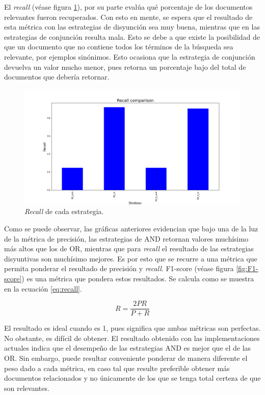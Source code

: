 El \textit{recall} (véase figura \ref{fig:Recall}), por su parte evalúa qué porcentaje de los documentos relevantes fueron recuperados. Con esto en mente, se espera que el resultado de esta métrica con las estrategias de disyunción sea muy buena, mientras que en las estrategias de conjunción resulta mala. Esto se debe a que existe la posibilidad de que un documento que no contiene todos los términos de la búsqueda sea relevante, por ejemplos sinónimos. Esto ocasiona que la estrategia de conjunción devuelva un valor mucho menor, pues retorna un porcentaje bajo del total de documentos que debería retornar.\\

\begin{figure}[H]
    \centering
    \includegraphics[width=\textwidth]{results/images/BS_recall_comparison.png}
    \caption{\textit{Recall} de cada estrategia.}
    \label{fig:Recall}
\end{figure}

Como se puede observar, las gráficas anteriores evidencian que bajo una de la luz de la métrica de precisión, las estrategias de AND retornan valores muchísimo más altos que los de OR, mientras que para \textit{recall} el resultado de las estrategias disyuntivas son muchísimo mejores. Es por esto que se recurre a una métrica que permita ponderar el resultado de precisión y \textit{recall}. F1-score (véase figura \ref{fig:F1-score}) es una métrica que pondera estos resultados. Se calcula como se muestra en la ecuación \ref{eq:recall}. 

\begin{equation}
    R = \frac{2PR}{P+R}
    \label{eq:recall}
\end{equation}

El resultado es ideal cuando es 1, pues significa que ambas métricas son perfectas. No obstante, es difícil de obtener. El resultado obtenido con las implementaciones actuales indica que el desempeño de las estrategias AND es mejor que el de las OR. Sin embargo, puede resultar conveniente ponderar de manera diferente el peso dado a cada métrica, en caso tal que resulte preferible obtener más documentos relacionados y no únicamente de los que se tenga total certeza de que son relevantes.

